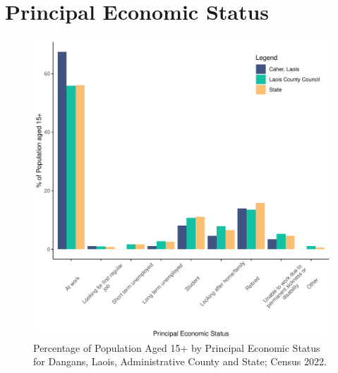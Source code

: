 \documentclass{article}
\begin{document}
  
\pagebreak
\section{Principal Economic Status}\label{sect:PES}
\begin{figure}[H]
	\centering
	\includegraphics[width = 140mm]{../figures/PESED.pdf}
	\caption{Percentage of Population Aged 15+ by Principal Economic Status for Dangans, Laois, Administrative County and State; Census 2022.}
	\label{fig:vbnv}
	\end{figure}
\end{document}
